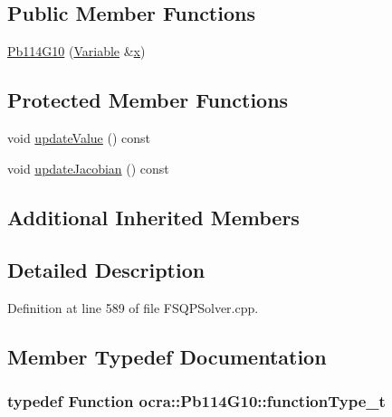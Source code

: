 \subsection*{Public Member Functions}
\begin{DoxyCompactItemize}
\item 
\hyperlink{classocra_1_1Pb114G10_a3a99a728ba252d05dd70b24d39dfb643}{Pb114\+G10} (\hyperlink{classocra_1_1Variable}{Variable} \&\hyperlink{classocra_1_1Function_a28825886d1f149c87b112ec2ec1dd486}{x})
\end{DoxyCompactItemize}
\subsection*{Protected Member Functions}
\begin{DoxyCompactItemize}
\item 
void \hyperlink{classocra_1_1Pb114G10_a2ff184cdc8e18ee61b3350f771d9c31b}{update\+Value} () const 
\item 
void \hyperlink{classocra_1_1Pb114G10_a71b05ba0499769375ff3997688e92116}{update\+Jacobian} () const 
\end{DoxyCompactItemize}
\subsection*{Additional Inherited Members}


\subsection{Detailed Description}


Definition at line 589 of file F\+S\+Q\+P\+Solver.\+cpp.



\subsection{Member Typedef Documentation}
\subsubsection[{\texorpdfstring{function\+Type\+\_\+t}{functionType_t}}]{\setlength{\rightskip}{0pt plus 5cm}typedef {\bf Function} {\bf ocra\+::\+Pb114\+G10\+::function\+Type\+\_\+t}}\hypertarget{classocra_1_1Pb114G10_abefa27aa6362ee95d59c39654bd7ab2f}{}\label{classocra_1_1Pb114G10_abefa27aa6362ee95d59c39654bd7ab2f}


